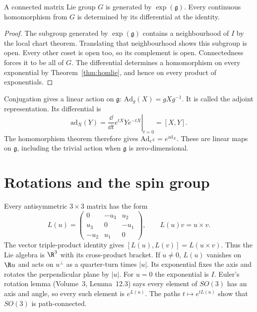 \begin{proposition}\label{prop:connectedgen}
A connected matrix Lie group $G$ is generated by $\exp(\mathfrak g)$.
Every continuous homomorphism from $G$ is determined by its differential
at the identity.
\end{proposition}
\begin{proof}
The subgroup generated by $\exp(\mathfrak g)$ contains a neighbourhood
of $I$ by the local chart theorem. Translating that neighbourhood shows
this subgroup is open. Every other coset is open too, so its complement
is open. Connectedness forces it to be all of $G$.
The differential determines a homomorphism on every exponential by
Theorem~\ref{thm:homlie}, and hence on every product of exponentials.
\end{proof}

Conjugation gives a linear action on $\mathfrak g$:
$\mathrm{Ad}_g(X)=gXg^{-1}$.
It is called the adjoint representation. Its differential is
\[
 \mathrm{ad}_X(Y)=\left.\frac{\dd}{\dd t}e^{tX}Ye^{-tX}\right|_{t=0}
 =[X,Y].
\]
The homomorphism theorem therefore gives
$\mathrm{Ad}_{e^X}=e^{\mathrm{ad}_X}$.
These are linear maps on $\mathfrak g$, including the trivial action when
$\mathfrak g$ is zero-dimensional.

\section{Rotations and the spin group}

Every antisymmetric $3\times3$ matrix has the form
\[
 L(u)=\begin{pmatrix}0&-u_3&u_2\\u_3&0&-u_1\\-u_2&u_1&0\end{pmatrix},
 \qquad L(u)v=u\times v.
\]
The vector triple-product identity gives
$[L(u),L(v)]=L(u\times v)$. Thus the Lie algebra is $\R^3$ with its
cross-product bracket. If $u\ne0$, $L(u)$ vanishes on $\R u$ and acts
on $u^\perp$ as a quarter-turn times $|u|$.
Its exponential fixes the axis and rotates the perpendicular plane by
$|u|$. For $u=0$ the exponential is $I$.
Euler's rotation lemma (Volume~3, Lemma~12.3) says every element of
$SO(3)$ has an axis and angle, so every such element is $e^{L(u)}$.
The paths $t\mapsto e^{tL(u)}$ show that $SO(3)$ is path-connected.

